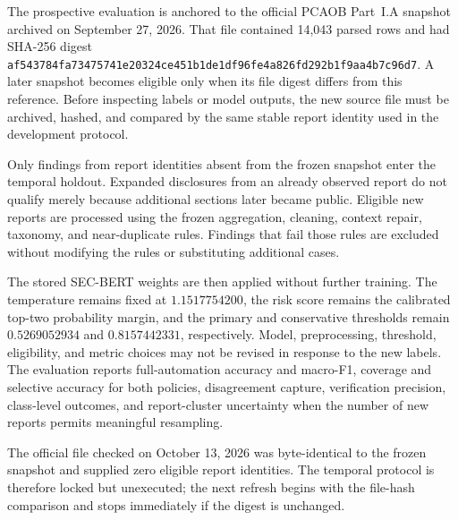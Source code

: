 \documentclass[11pt]{article}
\begin{document}
The prospective evaluation is anchored to the official PCAOB Part~I.A snapshot
archived on September 27, 2026. That file contained 14,043 parsed rows and had
SHA-256 digest
\texttt{af543784fa73475741e20324ce451b1de1df96fe4a826fd292b1f9aa4b7c96d7}.
A later snapshot becomes eligible only when its file digest differs from this
reference. Before inspecting labels or model outputs, the new source file must
be archived, hashed, and compared by the same stable report identity used in the
development protocol.

Only findings from report identities absent from the frozen snapshot enter the
temporal holdout. Expanded disclosures from an already observed report do not
qualify merely because additional sections later became public. Eligible new
reports are processed using the frozen aggregation, cleaning, context repair,
taxonomy, and near-duplicate rules. Findings that fail those rules are excluded
without modifying the rules or substituting additional cases.

The stored SEC-BERT weights are then applied without further training. The
temperature remains fixed at $1.1517754200$, the risk score remains the
calibrated top-two probability margin, and the primary and conservative
thresholds remain $0.5269052934$ and $0.8157442331$, respectively. Model,
preprocessing, threshold, eligibility, and metric choices may not be revised in
response to the new labels. The evaluation reports full-automation accuracy and
macro-F1, coverage and selective accuracy for both policies, disagreement
capture, verification precision, class-level outcomes, and report-cluster
uncertainty when the number of new reports permits meaningful resampling.

The official file checked on October 13, 2026 was byte-identical to the frozen
snapshot and supplied zero eligible report identities. The temporal protocol is
therefore locked but unexecuted; the next refresh begins with the file-hash
comparison and stops immediately if the digest is unchanged.
\end{document}
